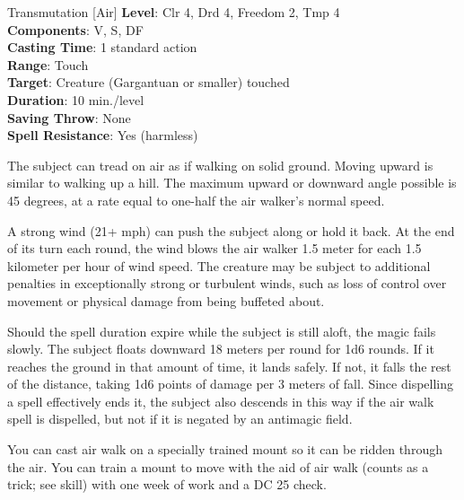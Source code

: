 {Transmutation [Air]}
{
	\textbf{Level}: Clr 4, Drd 4, Freedom 2, Tmp 4\\
	\textbf{Components}: V, S, DF\\
	\textbf{Casting Time}: 1 standard action\\
	\textbf{Range}: Touch\\
	\textbf{Target}: Creature (Gargantuan or smaller) touched\\
	\textbf{Duration}: 10 min./level\\
	\textbf{Saving Throw}: None\\
	\textbf{Spell Resistance}: Yes (harmless)\\
}
{
	The subject can tread on air as if walking on solid ground. Moving upward is similar to walking up a hill. The maximum upward or downward angle possible is 45 degrees, at a rate equal to one-half the air walker’s normal speed.

	A strong wind (21+ mph) can push the subject along or hold it back. At the end of its turn each round, the wind blows the air walker 1.5 meter for each 1.5 kilometer per hour of wind speed. The creature may be subject to additional penalties in exceptionally strong or turbulent winds, such as loss of control over movement or physical damage from being buffeted about.

	Should the spell duration expire while the subject is still aloft, the magic fails slowly. The subject floats downward 18 meters per round for 1d6 rounds. If it reaches the ground in that amount of time, it lands safely. If not, it falls the rest of the distance, taking 1d6 points of damage per 3 meters of fall. Since dispelling a spell effectively ends it, the subject also descends in this way if the air walk spell is dispelled, but not if it is negated by an antimagic field.

	You can cast air walk on a specially trained mount so it can be ridden through the air. You can train a mount to move with the aid of air walk (counts as a trick; see  skill) with one week of work and a DC 25  check.
}